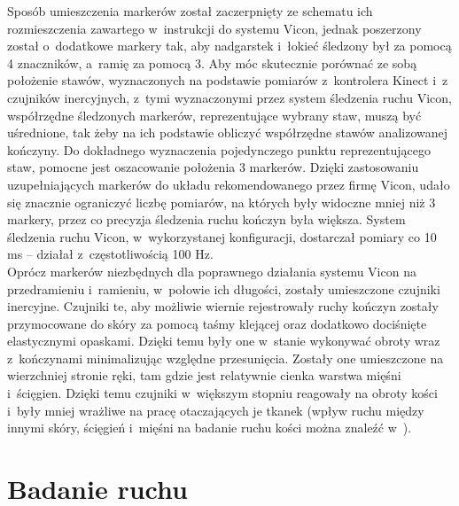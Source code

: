Sposób umieszczenia markerów został zaczerpnięty ze schematu ich rozmieszczenia zawartego w~instrukcji do systemu Vicon, jednak poszerzony został o~dodatkowe markery tak, aby nadgarstek i~łokieć śledzony był za pomocą 4 znaczników, a~ramię za pomocą 3. Aby móc skutecznie porównać ze sobą położenie stawów, wyznaczonych na podstawie pomiarów z~kontrolera Kinect i~z czujników inercyjnych, z~tymi wyznaczonymi przez system śledzenia ruchu Vicon, współrzędne śledzonych markerów, reprezentujące wybrany staw, muszą być uśrednione, tak żeby na ich podstawie obliczyć współrzędne stawów analizowanej kończyny. Do dokładnego wyznaczenia pojedynczego punktu reprezentującego staw, pomocne jest oszacowanie położenia 3 markerów. Dzięki zastosowaniu uzupełniających markerów do układu rekomendowanego przez firmę Vicon, udało się znacznie ograniczyć liczbę pomiarów, na których były widoczne mniej niż 3 markery, przez co precyzja śledzenia ruchu kończyn była większa. System śledzenia ruchu Vicon, w~wykorzystanej konfiguracji, dostarczał pomiary co 10 ms -- działał z~częstotliwością 100 Hz.  \\ 
				
Oprócz markerów niezbędnych dla poprawnego działania systemu Vicon na przedramieniu i~ramieniu, w~połowie ich długości, zostały umieszczone czujniki inercyjne. Czujniki te, aby możliwie wiernie rejestrowały ruchy kończyn zostały przymocowane do skóry za pomocą taśmy klejącej oraz dodatkowo dociśnięte elastycznymi opaskami. Dzięki temu były one w~stanie wykonywać obroty wraz z~kończynami minimalizując względne przesunięcia. Zostały one umieszczone na wierzchniej stronie ręki, tam gdzie jest relatywnie cienka warstwa mięśni i~ścięgien. Dzięki temu czujniki w~większym stopniu reagowały na obroty kości i~były mniej wrażliwe na pracę otaczających je tkanek (wpływ ruchu między innymi skóry, ścięgień i~mięśni na badanie ruchu kości można znaleźć w~\cite{Sati2016,Reinschmidt2016}).
				
\section{Badanie ruchu}
				
